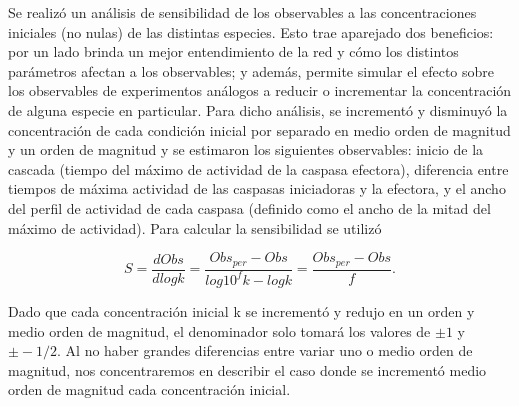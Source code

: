 Se realizó un análisis de sensibilidad de los observables a las concentraciones iniciales (no nulas) de las distintas especies. Esto trae aparejado dos beneficios: por un lado brinda un mejor entendimiento de la red y cómo los distintos parámetros afectan a los observables; y además, permite simular el efecto sobre los observables de experimentos análogos a reducir o incrementar la concentración de alguna especie en particular. Para dicho análisis, se incrementó y disminuyó la concentración de cada condición inicial por separado en medio orden de magnitud y un orden de magnitud y se estimaron los siguientes observables: inicio de la cascada (tiempo del máximo de actividad de la caspasa efectora), diferencia entre tiempos de máxima actividad de las caspasas iniciadoras y la efectora, y el ancho del perfil de actividad de cada caspasa (definido como el ancho de la mitad del máximo de actividad). Para calcular la sensibilidad se utilizó

\begin{equation*}
S = \frac{dObs}{d log k} = \frac{Obs_{per} - Obs}{log 10^{f} k - log k} = \frac{Obs_{per} - Obs}{f}.
\end{equation*}

\noindent Dado que cada concentración inicial k se incrementó y redujo en un orden y medio orden de magnitud, el denominador solo tomará los valores de $\pm 1$ y $\pm -1/2$. Al no haber grandes diferencias entre variar uno o medio orden de magnitud, nos concentraremos en describir el caso donde se incrementó medio orden de magnitud cada concentración inicial.


